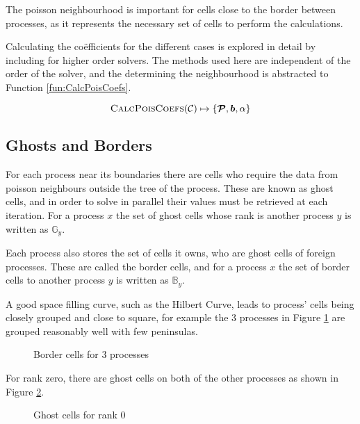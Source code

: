 \documentclass{IIBproject}
\newcommand{\vect}[1]{\bm{#1}}
\begin{document}
The poisson neighbourhood is important for cells close to the border between processes, as it represents the necessary set of cells to perform the calculations. 

Calculating the co\"efficients for the different cases is explored in detail by \cite{Yung2010} including for higher order solvers. The methods used here are independent of the order of the solver, and the determining the neighbourhood is abstracted to Function \ref{fun:CalcPoisCoefs}. 

\begin{equation}
	\label{fun:CalcPoisCoefs}
	\textproc{CalcPoisCoefs}(\mathcal{C}) \mapsto \{ \vect{\mathcal{P}}, \vect{b}, \alpha \}
\end{equation}

\subsection{Ghosts and Borders}
\label{sec:ghostsandborders}

For each process near its boundaries there are cells who require the data from poisson neighbours outside the tree of the process. These are known as ghost cells, and in order to solve in parallel their values must be retrieved at each iteration. For a process $x$ the set of ghost cells whose rank is another process $y$ is written as $\mathbb{G}_y$. 

Each process also stores the set of cells it owns, who are ghost cells of foreign processes. These are called the border cells, and for a process $x$ the set of border cells to another process $y$ is written as $\mathbb{B}_y$.

A good space filling curve, such as the Hilbert Curve, leads to process' cells being closely grouped and close to square, for example the 3 processes in Figure \ref{fig:borderline} are grouped reasonably well with few peninsulas. 

\begin{figure}[H]
	\label{fig:borderline}
	\caption{Border cells for 3 processes}
	
\end{figure}

For rank zero, there are ghost cells on both of the other processes as shown in Figure \ref{fig:borders-r0}. 

\begin{figure}[H]
	\label{fig:borders-r0}
	\caption{Ghost cells for rank 0}
	
\end{figure}
\end{document}
